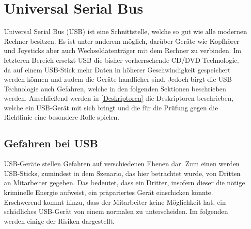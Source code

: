\chapter{Universal Serial Bus}
Universal Serial Bus (USB) ist eine Schnittstelle, welche so gut wie alle modernen Rechner besitzen. Es ist unter anderem möglich, darüber Geräte wie Kopfhörer und Joysticks aber auch Wechseldatenträger mit dem Rechner zu verbinden. Im letzteren Bereich ersetzt USB die bisher vorherrschende CD/DVD-Technologie, da auf einem USB-Stick mehr Daten in höherer Geschwindigkeit gespeichert werden können und zudem die Geräte handlicher sind. Jedoch birgt die USB-Technologie auch Gefahren, welche in den folgenden Sektionen beschrieben werden. Anschließend werden in \ref{Deskriptoren} die Deskriptoren beschrieben, welche ein USB-Gerät mit sich bringt und die für die Prüfung gegen die Richtlinie eine besondere Rolle spielen.

\section{Gefahren bei USB}\label{GefBeiUSB}
USB-Geräte stellen Gefahren auf verschiedenen Ebenen dar. Zum einen werden USB-Sticks, zumindest in dem Szenario, das hier betrachtet wurde, von Dritten an Mitarbeiter gegeben. Das bedeutet, dass ein Dritter, insofern dieser die nötige kriminelle Energie aufweist, ein präpariertes Gerät einschicken könnte. Erschwerend kommt hinzu, dass der Mitarbeiter keine Möglichkeit hat, ein schädliches USB-Gerät von einem normalen zu unterscheiden. Im folgenden werden einige der Risiken dargestellt.

